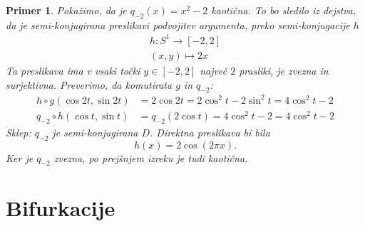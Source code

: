 \documentclass{article}
\newtheorem{primer}{Primer}
\begin{document}
\begin{primer}
Pokažimo, da je $q_{-2}(x) = x^2 - 2$ kaotična. To bo sledilo iz dejstva, da je 
semi-konjugirana preslikavi podvojitev argumenta, preko semi-konjugacije $h$ 
\begin{align*}
h: S^1 \rightarrow [-2, 2] \\ 
(x, y) \mapsto 2x 
\end{align*}
Ta preslikava ima v vsaki točki $y\in [-2, 2]$ največ $2$ prasliki, je zvezna in 
surjektivna. Preverimo, da komutirata $g$ in $q_{-2}$:
\begin{align*}
h\circ g(\cos{2t}, \sin{2t}) &= 2\cos{2t} = 2\cos^2{t} - 2\sin^2{t} = 4\cos^2{t} - 2\\
q_{-2}\circ h(\cos{t}, \sin{t}) &= q_{-2}(2\cos{t}) = 4\cos^2{t} - 2 = 4\cos^2{t} - 2
\end{align*}
Sklep: $q_{-2}$ je semi-konjugirana $D$. Direktna preslikava bi bila 
$$
h(x) = 2\cos(2\pi x).
$$
Ker je $q_{-2}$ zvezna, po prejšnjem izreku je tudi kaotična.
\end{primer}

\section{Bifurkacije}
\end{document}
